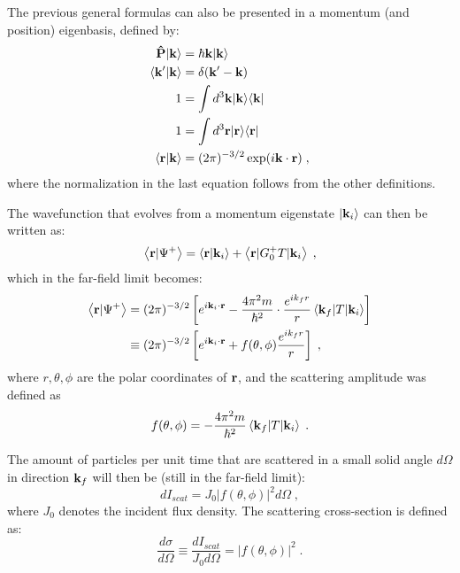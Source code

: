 The previous general formulas can also be presented in a momentum (and position) eigenbasis, defined by:
\begin{align*}
  \mathbf{\hat{P}}\vert \mathbf{k} \rangle & = \hbar \mathbf{k} \vert \mathbf{k} \rangle \\
  \left\langle \mathbf{k'} \vert \mathbf{k} \right\rangle & = \delta(\mathbf{k'}-\mathbf{k}) \\
  1 &= \int d^3\mathbf{k} \vert \mathbf{k} \rangle \langle \mathbf{k} \vert \\
  1 &= \int d^3\mathbf{r} \vert \mathbf{r} \rangle \langle \mathbf{r} \vert \\
  \left\langle \mathbf{r} \vert \mathbf{k} \right\rangle &= (2\pi)^{-3/2} \exp (i\mathbf{k}\cdot\mathbf{r}) \; ,
\end{align*}
where the normalization in the last equation follows from the other definitions.

The wavefunction that evolves from a momentum eigenstate $\vert \mathbf{k}_i \rangle$ can then be written as:
\begin{equation*}
  \left\langle \mathbf{r} \vert \Psi^+ \right\rangle = \left\langle \mathbf{r} \vert \mathbf{k}_i \right\rangle + \left\langle \mathbf{r} \vert G_0^+T \vert \mathbf{k}_i \right\rangle \; ,
\end{equation*}
which in the far-field limit becomes:
\begin{align*}
  \left\langle \mathbf{r} \vert \Psi^+ \right\rangle &= (2\pi)^{-3/2}\left[ e^{i\mathbf{k}_i\cdot\mathbf{r}} - \frac{4\pi^2m}{\hbar^2}\cdot\frac{e^{ik_f r}}{r} \left\langle \mathbf{k}_f \vert T \vert \mathbf{k}_i \right\rangle \right]  \\
  &\equiv (2\pi)^{-3/2}\left[ e^{i\mathbf{k}_i\cdot\mathbf{r}} + f(\theta,\phi)\frac{e^{ik_f r}}{r} \right] \; ,
\end{align*}
where $r,\theta,\phi$ are the polar coordinates of $\mathbf{r}$,
and the scattering amplitude was defined as
\begin{equation*}
  f(\theta, \phi) = -\frac{4\pi^2m}{\hbar^2}\left\langle \mathbf{k}_f \vert T \vert \mathbf{k}_i \right\rangle \; .
\end{equation*}

The amount of particles per unit time that are scattered in a small solid angle $d\Omega$ in direction $\mathbf{k}_f$ will then be (still in the far-field limit):
\begin{equation*}
  dI_{scat} = J_0\lvert f(\theta,\phi)\rvert^2d\Omega \; ,
\end{equation*}
where $J_0$ denotes the incident flux density. The scattering cross-section is defined as:
\begin{equation*}
  \frac{d\sigma}{d\Omega}\equiv \frac{dI_{scat}}{J_0 d\Omega} = \lvert f(\theta,\phi) \rvert^2 \; .
\end{equation*}



